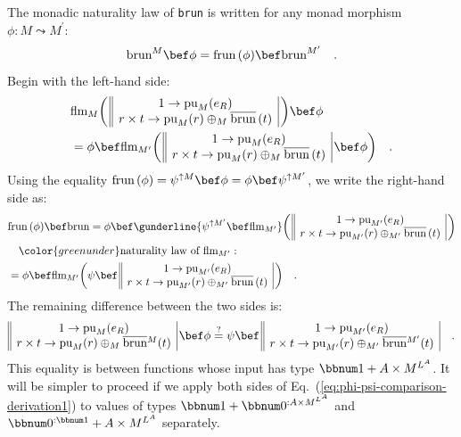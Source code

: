 The monadic naturality law of \lstinline!brun! is written for any
monad morphism $\phi:M\leadsto M^{\prime}$:
\[
\text{brun}^{M}\bef\phi=\text{frun}\,(\phi)\bef\text{brun}^{M^{\prime}}\quad.
\]
Begin with the left-hand side:
\begin{align*}
 & \text{flm}_{M}\bigg(\,\begin{array}{||c|}
1\rightarrow\text{pu}_{M}(e_{R})\\
r\times t\rightarrow\text{pu}_{M}(r)\oplus_{M}\overline{\text{brun}}\,(t)
\end{array}\,\bigg)\bef\phi\\
 & =\phi\bef\text{flm}_{M^{\prime}}\bigg(\,\begin{array}{||c|}
1\rightarrow\text{pu}_{M}(e_{R})\\
r\times t\rightarrow\text{pu}_{M}(r)\oplus_{M}\overline{\text{brun}}\,(t)
\end{array}\,\bef\phi\bigg)\quad.
\end{align*}
Using the equality $\text{frun}\,(\phi)=\psi^{\uparrow M}\bef\phi=\phi\bef\psi^{\uparrow M^{\prime}}$,
we write the right-hand side as:
\begin{align*}
 & \text{frun}\,(\phi)\bef\text{brun}=\phi\bef\gunderline{\psi^{\uparrow M^{\prime}}\bef\text{flm}_{M^{\prime}}}\bigg(\,\begin{array}{||c|}
1\rightarrow\text{pu}_{M^{\prime}}(e_{R})\\
r\times t\rightarrow\text{pu}_{M^{\prime}}(r)\oplus_{M^{\prime}}\overline{\text{brun}}\,(t)
\end{array}\,\bigg)\\
 & \quad{\color{greenunder}\text{naturality law of }\text{flm}_{M^{\prime}}:}\quad\\
 & =\phi\bef\text{flm}_{M^{\prime}}\bigg(\psi\bef\,\begin{array}{||c|}
1\rightarrow\text{pu}_{M^{\prime}}(e_{R})\\
r\times t\rightarrow\text{pu}_{M^{\prime}}(r)\oplus_{M^{\prime}}\overline{\text{brun}}\,(t)
\end{array}\,\bigg)\quad.
\end{align*}
The remaining difference between the two sides is:
\begin{equation}
\begin{array}{||c|}
1\rightarrow\text{pu}_{M}(e_{R})\\
r\times t\rightarrow\text{pu}_{M}(r)\oplus_{M}\overline{\text{brun}}{}^{M}(t)
\end{array}\,\bef\phi\overset{?}{=}\psi\bef\,\begin{array}{||c|}
1\rightarrow\text{pu}_{M^{\prime}}(e_{R})\\
r\times t\rightarrow\text{pu}_{M^{\prime}}(r)\oplus_{M^{\prime}}\overline{\text{brun}}{}^{M^{\prime}}(t)
\end{array}\quad.\label{eq:phi-psi-comparison-derivation1}
\end{equation}
This equality is between functions whose input has type $\bbnum 1+A\times M^{L^{A}}$.
It will be simpler to proceed if we apply both sides of Eq.~(\ref{eq:phi-psi-comparison-derivation1})
to values of types $\bbnum 1+\bbnum 0^{:A\times M^{L^{A}}}$ and $\bbnum 0^{:\bbnum 1}+A\times M^{L^{A}}$
separately.

